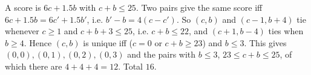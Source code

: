 A score is $6c+1.5b$ with $c+b\le25$. Two pairs give the same score iff $6c+1.5b=6c'+1.5b'$, i.e. $b'-b=4(c-c')$. So $(c,b)$ and $(c-1,b+4)$ tie whenever $c\ge1$ and $c+b+3\le25$, i.e. $c+b\le22$, and $(c+1,b-4)$ ties when $b\ge4$. Hence $(c,b)$ is unique iff ($c=0$ or $c+b\ge23$) and $b\le3$. This gives $(0,0),(0,1),(0,2),(0,3)$ and the pairs with $b\le3$, $23\le c+b\le25$, of which there are $4+4+4=12$. Total $\boxed{16}$.

